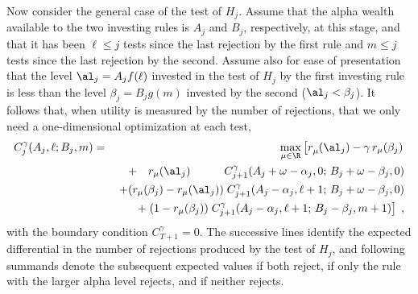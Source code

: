\documentclass[12pt]{article}
\begin{document}
 
 Now consider the general case of the test of $H_j$.  Assume that the alpha
 wealth available to the two investing rules is $A_j$ and $B_j$, respectively,
 at this stage, and that it has been $\ell \le j$ tests since the last rejection
 by the first rule and $m \le j$ tests since the last rejection by the second.
  Assume also for ease of presentation that the level $\al_j = A_j f(\ell)$
 invested in the test of $H_j$ by the first investing rule is less than the
 level $\beta_j = B_j g(m)$ invested by the second ($\al_j < \beta_j$). It
 follows that, when utility is measured by the number of rejections, that we
only need a one-dimensional optimization at each test,
 \begin{eqnarray}
   C^\gamma_j(A_j,\ell;B_j,m) 
    &=& \max_{\mu \in \R } \left[ r^{}_{\mu}(\al_j) - \gamma \, r_{\mu}(\beta_j)\right. \cr
    && \;+ \quad r_{\mu}(\al_j) \qquad \quad
              C^\gamma_{j+1}(A_j+\omega-\alpha_j,0;\,B_j+\omega-\beta_j,0)  \cr
    && \;+ (r_\mu(\beta_j)-r_\mu(\al_j)) \; 
              C_{j+1}^\gamma(A_j-\alpha_j,\ell+1;\,B_j+\omega-\beta_j,0) \cr
    && \;+ \left.  (1-r_\mu(\beta_j)) \; 
              C_{j+1}^\gamma(A_j-\alpha_j,\ell+1;\,B_j-\beta_j,m+1) \right] \;,
 \label{eq:util}
 \end{eqnarray}
 with the boundary condition $C_{T+1}^\gamma = 0$.  The successive lines
 identify the expected differential in the number of rejections produced by the
 test of $H_j$, and following summands denote the subsequent expected values if
 both reject, if only the rule with the larger alpha level rejects, and if
 neither rejects.  
\end{document}

